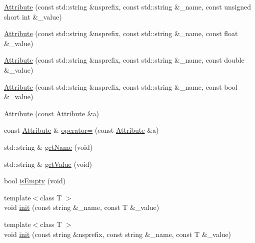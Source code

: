\begin{DoxyCompactItemize}
\item 
\mbox{\hyperlink{classXMLWriterAPI_1_1Attribute_a632d5cb11f50e03bf79b27fb97b132a4}{Attribute}} (const std\+::string \&nsprefix, const std\+::string \&\+\_\+name, const unsigned short int \&\+\_\+value)
\item 
\mbox{\hyperlink{classXMLWriterAPI_1_1Attribute_a0640c93b661665cb3ed185178bd69119}{Attribute}} (const std\+::string \&nsprefix, const std\+::string \&\+\_\+name, const float \&\+\_\+value)
\item 
\mbox{\hyperlink{classXMLWriterAPI_1_1Attribute_a501528e4f1a7b1cabeaf7cfc21c0b97d}{Attribute}} (const std\+::string \&nsprefix, const std\+::string \&\+\_\+name, const double \&\+\_\+value)
\item 
\mbox{\hyperlink{classXMLWriterAPI_1_1Attribute_ac570bd81cf851adca96d3b28eaa58c3e}{Attribute}} (const std\+::string \&nsprefix, const std\+::string \&\+\_\+name, const bool \&\+\_\+value)
\item 
\mbox{\hyperlink{classXMLWriterAPI_1_1Attribute_a44b71cf3ef8f67bb010561184f1678d1}{Attribute}} (const \mbox{\hyperlink{classXMLWriterAPI_1_1Attribute}{Attribute}} \&a)
\item 
const \mbox{\hyperlink{classXMLWriterAPI_1_1Attribute}{Attribute}} \& \mbox{\hyperlink{classXMLWriterAPI_1_1Attribute_a073917fc63e79e3f44d26c8a689d40e4}{operator=}} (const \mbox{\hyperlink{classXMLWriterAPI_1_1Attribute}{Attribute}} \&a)
\item 
std\+::string \& \mbox{\hyperlink{classXMLWriterAPI_1_1Attribute_a7ad56e533adb981e46f9373d1631388c}{get\+Name}} (void)
\item 
std\+::string \& \mbox{\hyperlink{classXMLWriterAPI_1_1Attribute_aed17d7d4a0c883d240090c7c42599854}{get\+Value}} (void)
\item 
bool \mbox{\hyperlink{classXMLWriterAPI_1_1Attribute_a5d51eb94811cbc00beb32d68af4ed1fe}{is\+Empty}} (void)
\item 
{\footnotesize template$<$class T $>$ }\\void \mbox{\hyperlink{classXMLWriterAPI_1_1Attribute_ae66fbb36ffa554cc2e1b09514e8f494e}{init}} (const string \&\+\_\+name, const T \&\+\_\+value)
\item 
{\footnotesize template$<$class T $>$ }\\void \mbox{\hyperlink{classXMLWriterAPI_1_1Attribute_a3e3cdd2448f031232510d86afc49f1b0}{init}} (const string \&nsprefix, const string \&\+\_\+name, const T \&\+\_\+value)
\end{DoxyCompactItemize}


